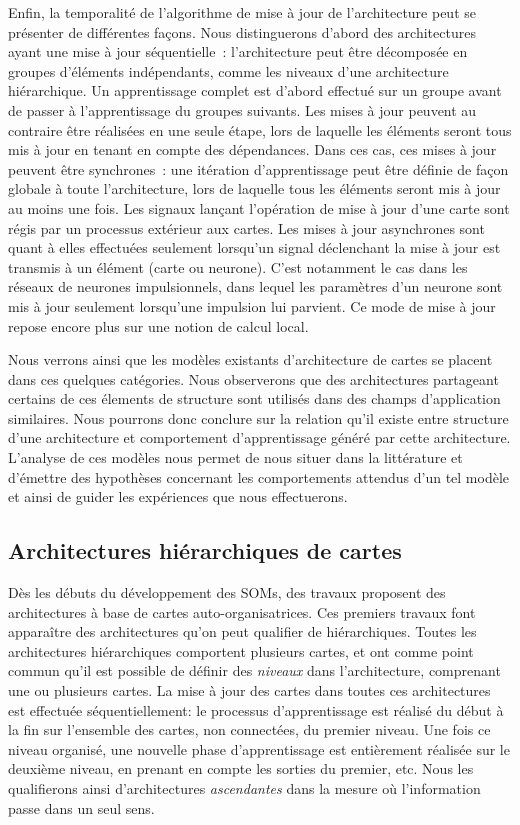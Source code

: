 \documentclass[../main]{subfiles}
\begin{document}
Enfin, la temporalité de l'algorithme de mise à jour de l'architecture peut se présenter de différentes façons. Nous distinguerons d'abord des architectures ayant une mise à jour séquentielle~: l'architecture peut être décomposée en groupes d'éléments indépendants, comme les niveaux d'une architecture hiérarchique. 
Un apprentissage complet est d'abord effectué sur un groupe avant de passer à l'apprentissage du groupes suivants. 
Les mises à jour peuvent au contraire être réalisées en une seule étape, lors de laquelle les éléments seront tous mis à jour en tenant en compte des dépendances. Dans ces cas, ces mises à jour peuvent être synchrones~: une itération d'apprentissage peut être définie de façon globale à toute l'architecture, lors de laquelle tous les éléments seront mis à jour au moins une fois. Les signaux lançant l'opération de mise à jour d'une carte sont régis par un processus extérieur aux cartes.
Les mises à jour asynchrones sont quant à elles effectuées seulement lorsqu'un signal déclenchant la mise à jour est transmis à un élément (carte ou neurone). C'est notamment le cas dans les réseaux de neurones impulsionnels, dans lequel les paramètres d'un neurone sont mis à jour seulement lorsqu'une impulsion lui parvient. Ce mode de mise à jour repose encore plus sur une notion de calcul local.

Nous verrons ainsi que les modèles existants d'architecture de cartes se placent dans ces quelques catégories.
Nous observerons que des architectures partageant certains de ces élements de structure sont utilisés dans des champs d'application similaires. Nous pourrons donc conclure sur la relation qu'il existe entre structure d'une architecture et comportement d'apprentissage généré par cette architecture.
L'analyse de ces modèles nous permet de nous situer dans la littérature et d'émettre des hypothèses concernant les comportements attendus d'un tel modèle et ainsi de guider les expériences que nous effectuerons.

\subsection{Architectures hiérarchiques de cartes}

Dès les débuts du développement des SOMs, des travaux proposent des architectures à base de cartes auto-organisatrices. Ces premiers travaux font apparaître des architectures qu'on peut qualifier de hiérarchiques.
Toutes les architectures hiérarchiques comportent plusieurs cartes, et ont comme point commun qu'il est possible de définir des \emph{niveaux} dans l'architecture, comprenant une ou plusieurs cartes. 
La mise à jour des cartes dans toutes ces architectures est effectuée séquentiellement: le processus d'apprentissage est réalisé du début à la fin sur l'ensemble des cartes, non connectées, du premier niveau. Une fois ce niveau organisé, une nouvelle phase d'apprentissage est entièrement réalisée sur le deuxième niveau, en prenant en compte les sorties du premier, etc.
Nous les qualifierons ainsi d'architectures \emph{ascendantes} dans la mesure où l'information passe dans un seul sens.
\end{document}
